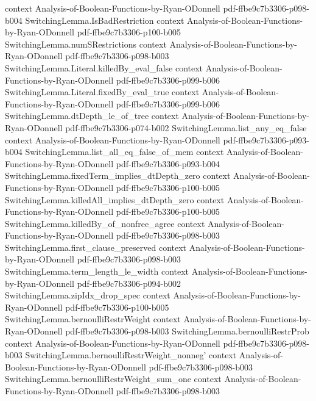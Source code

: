 \begin{lemma}
  {context}
  {Analysis-of-Boolean-Functions-by-Ryan-ODonnell}
  {pdf-ffbe9c7b3306-p098-b004}
\proofstep
  {SwitchingLemma.IsBadRestriction}
  {context}
  {Analysis-of-Boolean-Functions-by-Ryan-ODonnell}
  {pdf-ffbe9c7b3306-p100-b005}
\proofstep
  {SwitchingLemma.numSRestrictions}
  {context}
  {Analysis-of-Boolean-Functions-by-Ryan-ODonnell}
  {pdf-ffbe9c7b3306-p098-b003}
\proofstep
  {SwitchingLemma.Literal.killedBy_eval_false}
  {context}
  {Analysis-of-Boolean-Functions-by-Ryan-ODonnell}
  {pdf-ffbe9c7b3306-p099-b006}
\proofstep
  {SwitchingLemma.Literal.fixedBy_eval_true}
  {context}
  {Analysis-of-Boolean-Functions-by-Ryan-ODonnell}
  {pdf-ffbe9c7b3306-p099-b006}
\proofstep
  {SwitchingLemma.dtDepth_le_of_tree}
  {context}
  {Analysis-of-Boolean-Functions-by-Ryan-ODonnell}
  {pdf-ffbe9c7b3306-p074-b002}
\proofstep
  {SwitchingLemma.list_any_eq_false}
  {context}
  {Analysis-of-Boolean-Functions-by-Ryan-ODonnell}
  {pdf-ffbe9c7b3306-p093-b004}
\proofstep
  {SwitchingLemma.list_all_eq_false_of_mem}
  {context}
  {Analysis-of-Boolean-Functions-by-Ryan-ODonnell}
  {pdf-ffbe9c7b3306-p093-b004}
\proofstep
  {SwitchingLemma.fixedTerm_implies_dtDepth_zero}
  {context}
  {Analysis-of-Boolean-Functions-by-Ryan-ODonnell}
  {pdf-ffbe9c7b3306-p100-b005}
\proofstep
  {SwitchingLemma.killedAll_implies_dtDepth_zero}
  {context}
  {Analysis-of-Boolean-Functions-by-Ryan-ODonnell}
  {pdf-ffbe9c7b3306-p100-b005}
\proofstep
  {SwitchingLemma.killedBy_of_nonfree_agree}
  {context}
  {Analysis-of-Boolean-Functions-by-Ryan-ODonnell}
  {pdf-ffbe9c7b3306-p098-b003}
\proofstep
  {SwitchingLemma.first_clause_preserved}
  {context}
  {Analysis-of-Boolean-Functions-by-Ryan-ODonnell}
  {pdf-ffbe9c7b3306-p098-b003}
\proofstep
  {SwitchingLemma.term_length_le_width}
  {context}
  {Analysis-of-Boolean-Functions-by-Ryan-ODonnell}
  {pdf-ffbe9c7b3306-p094-b002}
\proofstep
  {SwitchingLemma.zipIdx_drop_spec}
  {context}
  {Analysis-of-Boolean-Functions-by-Ryan-ODonnell}
  {pdf-ffbe9c7b3306-p100-b005}
\proofstep
  {SwitchingLemma.bernoulliRestrWeight}
  {context}
  {Analysis-of-Boolean-Functions-by-Ryan-ODonnell}
  {pdf-ffbe9c7b3306-p098-b003}
\proofstep
  {SwitchingLemma.bernoulliRestrProb}
  {context}
  {Analysis-of-Boolean-Functions-by-Ryan-ODonnell}
  {pdf-ffbe9c7b3306-p098-b003}
\proofstep
  {SwitchingLemma.bernoulliRestrWeight_nonneg'}
  {context}
  {Analysis-of-Boolean-Functions-by-Ryan-ODonnell}
  {pdf-ffbe9c7b3306-p098-b003}
\proofstep
  {SwitchingLemma.bernoulliRestrWeight_sum_one}
  {context}
  {Analysis-of-Boolean-Functions-by-Ryan-ODonnell}
  {pdf-ffbe9c7b3306-p098-b003}
\proofstep

\end{lemma}

